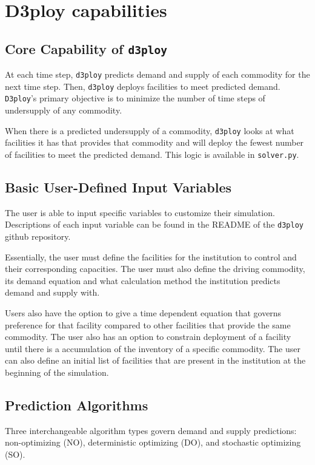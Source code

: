 \documentclass[11pt,letterpaper]{article}
\newcommand{\deploy}{\texttt{d3ploy}\xspace}%
\newcommand{\Deploy}{\texttt{D3ploy}\xspace}%
\begin{document}
\section{D3ploy capabilities}
\subsection{\textbf{Core Capability of \deploy}}
At each time step, \deploy predicts demand and supply of each 
commodity for the next time step.
Then, \deploy deploys facilities to meet predicted demand. 
\Deploy's primary objective is to minimize the number of time 
steps of undersupply of any commodity. 

When there is a predicted undersupply of a commodity, \deploy looks 
at what facilities it has that provides that commodity and 
will deploy the fewest number of facilities
to meet the predicted demand. 
This logic is available in \texttt{solver.py}. 

\subsection{\textbf{Basic User-Defined Input Variables}}
The user is able to input specific variables to customize their
simulation. 
Descriptions of each input variable can be found in the 
README of the \deploy github repository.

Essentially, the user must define the facilities for the 
institution to control and their corresponding capacities. 
The user must also define the driving commodity, its demand 
equation and what calculation method the institution predicts 
demand and supply with. 

Users also have the option to give a time dependent equation that governs
preference for that facility compared to other facilities that 
provide the same commodity. 
The user also has an option to constrain deployment of a facility 
until there is a accumulation of the inventory of a specific commodity.  
The user can also define an initial list of facilities that 
are present in the institution at the beginning of the simulation. 

\subsection{\textbf{Prediction Algorithms}}
Three interchangeable algorithm types govern demand and supply 
predictions: non-optimizing (NO), deterministic optimizing (DO), and stochastic
optimizing (SO). 
\end{document}
